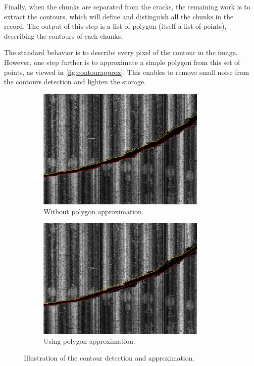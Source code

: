 Finally, when the chunks are separated from the cracks, the remaining work is to extract the contours, which will define and distinguish all the chunks in the record. The output of this step is a list of polygon (itself a list of points), describing the contours of each chunks.

The standard behavior is to describe every pixel of the contour in the image. However, one step further is to approximate a simple polygon from this set of points, as viewed in \autoref{fig:contourapprox}. This enables to remove small noise from the contours detection and lighten the storage.


\begin{figure}[!ht]
\centering
    \begin{subfigure}[t]{0.45\textwidth}
    \centering
    \includegraphics[width=0.9\textwidth]{images/approx-without}
    \caption{Without polygon approximation.}
    \label{fig:withoutapprox}
    \end{subfigure}
    \begin{subfigure}[t]{0.45\textwidth}
    \centering
    \includegraphics[width=0.9\textwidth]{images/approx-with}
    \caption{Using polygon approximation.}
    \label{fig:withapprox}
    \end{subfigure}
    \caption{Illustration of the contour detection and approximation.}
    \label{fig:contourapprox}
\end{figure}

